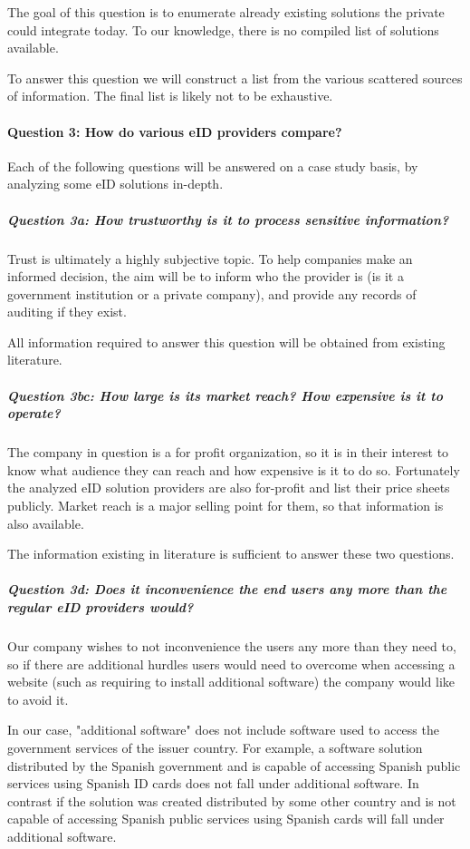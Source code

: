 The goal of this question is to enumerate already existing solutions the private could integrate today. To our knowledge, there is no compiled list of solutions available.

To answer this question we will construct a list from the various scattered sources of information. The final list is likely not to be exhaustive.

\paragraph{Question 3: How do various eID providers compare?}\noindent

Each of the following questions will be answered on a case study basis, by analyzing some eID solutions in-depth.

\subparagraph{Question 3a: How trustworthy is it to process sensitive information?}\noindent

Trust is ultimately a highly subjective topic. To help companies make an informed decision, the aim will be to inform who the provider is (is it a government institution or a private company), and provide any records of auditing if they exist.

All information required to answer this question will be obtained from existing literature.

\subparagraph{Question 3bc: How large is its market reach? How expensive is it to operate?}\noindent

The company in question is a for profit organization, so it is in their interest to know what audience they can reach and how expensive is it to do so. Fortunately the analyzed eID solution providers are also for-profit and list their price sheets publicly. Market reach is a major selling point for them, so that information is also available.

The information existing in literature is sufficient to answer these two questions.

\subparagraph{Question 3d: Does it inconvenience the end users any more than the regular eID providers would?}\noindent

Our company wishes to not inconvenience the users any more than they need to, so if there are additional hurdles users would need to overcome when accessing a website (such as requiring to install additional software) the company would like to avoid it.

In our case, "additional software" does not include software used to access the government services of the issuer country. For example, a software solution distributed by the Spanish government and is capable of accessing Spanish public services using Spanish ID cards does not fall under additional software. In contrast if the solution was created distributed by some other country and is not capable of accessing Spanish public services using Spanish cards will fall under additional software.

